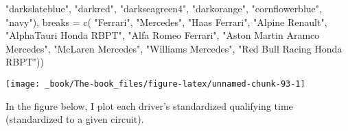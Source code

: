 \documentclass[
]{book}
\newenvironment{Shaded}{\begin{snugshade}}{\end{snugshade}}
\newcommand{\AttributeTok}[1]{\textcolor[rgb]{0.77,0.63,0.00}{#1}}
\newcommand{\FunctionTok}[1]{\textcolor[rgb]{0.00,0.00,0.00}{#1}}
\newcommand{\NormalTok}[1]{#1}
\newcommand{\StringTok}[1]{\textcolor[rgb]{0.31,0.60,0.02}{#1}}
\begin{document}
\begin{Shaded}
\begin{Highlighting}[]
                               \StringTok{"darkslateblue"}\NormalTok{, }
                                \StringTok{"darkred"}\NormalTok{,  }
                                \StringTok{"darkseagreen4"}\NormalTok{, }
                                \StringTok{"darkorange"}\NormalTok{, }
                                \StringTok{"cornflowerblue"}\NormalTok{,}
                               \StringTok{"navy"}\NormalTok{),}
                     \AttributeTok{breaks =} \FunctionTok{c}\NormalTok{( }\StringTok{"Ferrari"}\NormalTok{,}
                                 \StringTok{"Mercedes"}\NormalTok{,}
                                 \StringTok{"Haas Ferrari"}\NormalTok{,}
                                 \StringTok{"Alpine Renault"}\NormalTok{,}
                                 \StringTok{"AlphaTauri Honda RBPT"}\NormalTok{,}
                                 \StringTok{"Alfa Romeo Ferrari"}\NormalTok{, }
                                 \StringTok{"Aston Martin Aramco Mercedes"}\NormalTok{,}
                                 \StringTok{"McLaren Mercedes"}\NormalTok{,}
                                 \StringTok{"Williams Mercedes"}\NormalTok{,}
                                 \StringTok{"Red Bull Racing Honda RBPT"}\NormalTok{))}
\end{Highlighting}
\end{Shaded}

\begin{center}\texttt{[image: \_book/The-book\_files/figure-latex/unnamed-chunk-93-1]} \end{center}

In the figure below, I plot each driver's standardized qualifying time (standardized to a given circuit).
\end{document}
